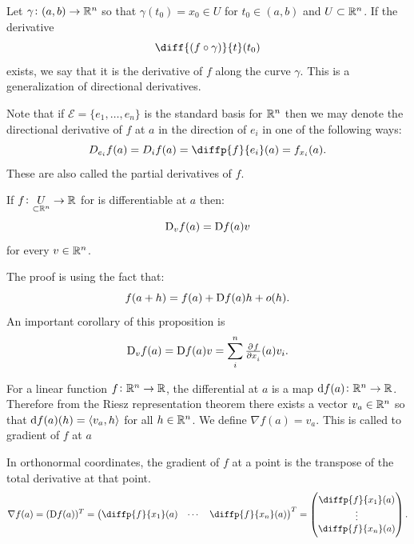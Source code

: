\documentclass[11pt,a4paper]{article}
\begin{document}
\begin{definition}
  Let $\gamma \colon (a,b) \to \mathbb{R}^n$ so that $\gamma(t_0) = x_0 \in U$
  for $t_0 \in (a,b)$ and $U \subset \mathbb{R}^n$.
  If the derivative
  \[
    \diff{(f \circ \gamma)}{t}(t_0)
  \]
  exists, we say that it is the derivative of $f$ along the curve $\gamma$.
  This is a generalization of directional derivatives.
\end{definition}

\begin{remark}
  Note that if $\mathcal{E} = \{e_1,\dots,e_n\}$ is the standard basis
  for $\mathbb{R}^n$ then we may denote the directional derivative of $f$ at $a$
  in the direction of $e_i$ in one of the following ways:
  \[
    D_{e_i} f(a) = D_i f(a) = \diffp{f}{{e_i}}(a) = 
    f_{x_i}(a).
  \]
  These are also called the partial derivatives of $f$.
\end{remark}

\begin{proposition}
  If $f \colon \underset{\subset \mathbb{R}^n}{U} \to \mathbb{R}$ for is differentiable 
  at $a$ then:
    \[
      \mathrm{D}_v f(a) = \mathrm{D} f(a) v
    \]	
  for every $v \in \mathbb{R}^n$.
\end{proposition} 
\begin{remark}
  The proof is using the fact that:
  \[
    f(a+h) = f(a) + \mathrm{D} f(a)h + o(h).
  \]
  An important corollary of this proposition is
  \[
    \Dif_v f(a) = \Dif f(a) v  = 
    \sum_{i}^{n} \pd{f}{x_i}(a)v_i.
  \]
\end{remark}

\begin{definition}[Gradient]
  For a linear function $f \colon \mathbb{R}^n \to \mathbb{R}$,
  the differential at $a$ is a map $\mathrm{d} f(a) \colon \mathbb{R}^n \to \mathbb{R}$.
  Therefore from the Riesz representation theorem
  there exists a vector $v_a \in \mathbb{R}^n$ so that $\mathrm{d} f(a)(h) = \left\langle v_a, h \right\rangle$
  for all $h \in \mathbb{R}^n$.
  We define $\nabla f(a) = v_a$.
  This is called to gradient of $f$ at $a$
\end{definition}
\begin{remark}
  In orthonormal coordinates, the gradient of $f$ at a point
  is the transpose of the total derivative at that point.
  \[
    \nabla f(a) =
    (\Dif f(a))^T =
    \begin{pmatrix}
      \diffp{f}{{x_1}}(a) & \cdots & \diffp{f}{{x_n}}(a)
    \end{pmatrix}^T =
    \begin{pmatrix}
      \diffp{f}{{x_1}}(a) \\ \vdots \\ \diffp{f}{{x_n}}(a)
    \end{pmatrix}.
  \]
\end{remark}
\end{document}

